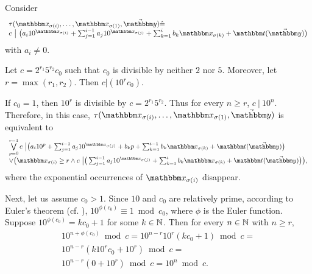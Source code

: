 Consider
%
$$
\begin{array}{l}
\tau(\ivarx_{\sigma(i)}, \ldots, \ivarx_{\sigma(1)}, \vec{\ivary}) \Def  \\
c\ \big |\ \big(a_i 10^{\ivarx_{\sigma(i)}} + \sum_{j=1}^{i-1} a_j 10^{\ivarx_{\sigma(j)}} + \sum_{k=1}^{i} b_k \ivarx_{\sigma(k)} 
+ \iterm(\vec{\ivary}) \big)
\end{array}
$$
with $a_i \neq 0$.
%

Let $c = 2^{r_1} 5^{r_2}  c_0$ such that $c_0$ is divisible by neither $2$ nor $5$. Moreover, let $r = \max(r_1, r_2)$. Then $c | (10^rc_0)$. 

If $c_0 = 1$, then $10^r$ is divisible by $c = 2^{r_1}5^{r_2}$. Thus for every $n \ge r$, $c \ |\ 10^n$.  Therefore, in this case, $\tau(\ivarx_{\sigma(i)}, \ldots, \ivarx_{\sigma(1)}, \vec{\ivary})$ is equivalent to 
\[
\small
\begin{array}{l}
\bigvee \limits_{p = 0}^{r - 1} c\ \big | \big(a_i 10^{p} + \sum_{j=1}^{i-1} a_j 10^{\ivarx_{\sigma(j)}} + b_kp + \sum_{k=1}^{i-1} b_k \ivarx_{\sigma(k)} 
+ \iterm(\vec{\ivary}) \big)\\
%
\vee \big(\ivarx_{\sigma(i)} \ge r \wedge c\ \big | \big(\sum_{j=1}^{i-1} a_j 10^{\ivarx_{\sigma(j)}} + \sum_{k=1}^{i} b_k \ivarx_{\sigma(k)} 
+ \iterm(\vec{\ivary}) \big)\big),
\end{array}
\]
where the exponential occurrences of $\ivarx_{\sigma(i)}$ disappear.

Next, let us assume $c_0 > 1$. Since $10$ and $c_0$ are relatively prime, according to Euler's theorem (cf. \cite{HW80}), $10^{\phi(c_0)} \equiv 1 \bmod c_0$, where $\phi$ is the Euler function. Suppose $10^{\phi(c_0)} = kc_0 + 1$ for some $k \in \mathbb{N}$. 
Then for every $n \in \mathbb{N}$ with $n \ge r$, 
$$
\begin{array}{l}
10^{n + \phi(c_0)} \bmod c =10^{n-r} 10^r (kc_0 + 1) \bmod c = \\
10^{n-r} (k 10^rc_0 + 10^r) \bmod c = \\
10^{n-r} (0+10^r) \bmod c = 10^n \bmod c.
\end{array}
$$

